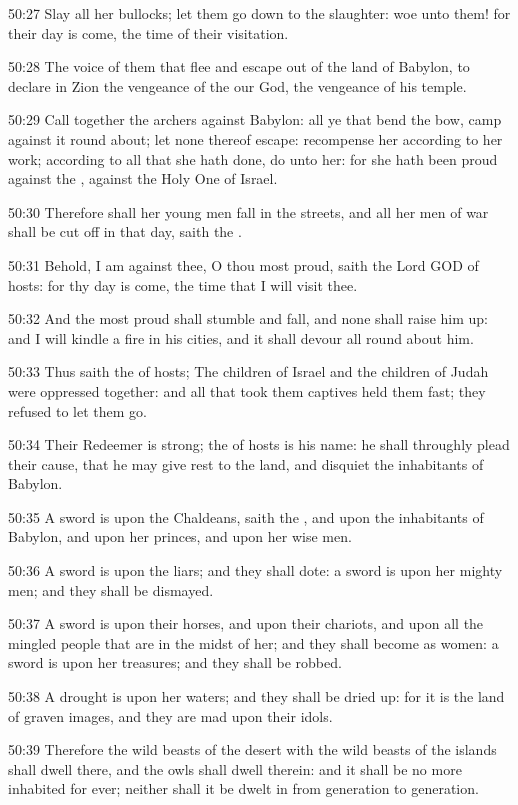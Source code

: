 50:27 Slay all her bullocks; let them go down to the slaughter: woe unto them! for their day is come, the time of their visitation.

50:28 The voice of them that flee and escape out of the land of Babylon, to declare in Zion the vengeance of the \LORD our God, the vengeance of his temple.

50:29 Call together the archers against Babylon: all ye that bend the bow, camp against it round about; let none thereof escape: recompense her according to her work; according to all that she hath done, do unto her: for she hath been proud against the \LORD, against the Holy One of Israel.

50:30 Therefore shall her young men fall in the streets, and all her men of war shall be cut off in that day, saith the \LORD.

50:31 Behold, I am against thee, O thou most proud, saith the Lord GOD of hosts: for thy day is come, the time that I will visit thee.

50:32 And the most proud shall stumble and fall, and none shall raise him up: and I will kindle a fire in his cities, and it shall devour all round about him.

50:33 Thus saith the \LORD of hosts; The children of Israel and the children of Judah were oppressed together: and all that took them captives held them fast; they refused to let them go.

50:34 Their Redeemer is strong; the \LORD of hosts is his name: he shall throughly plead their cause, that he may give rest to the land, and disquiet the inhabitants of Babylon.

50:35 A sword is upon the Chaldeans, saith the \LORD, and upon the inhabitants of Babylon, and upon her princes, and upon her wise men.

50:36 A sword is upon the liars; and they shall dote: a sword is upon her mighty men; and they shall be dismayed.

50:37 A sword is upon their horses, and upon their chariots, and upon all the mingled people that are in the midst of her; and they shall become as women: a sword is upon her treasures; and they shall be robbed.

50:38 A drought is upon her waters; and they shall be dried up: for it is the land of graven images, and they are mad upon their idols.

50:39 Therefore the wild beasts of the desert with the wild beasts of the islands shall dwell there, and the owls shall dwell therein: and it shall be no more inhabited for ever; neither shall it be dwelt in from generation to generation.

